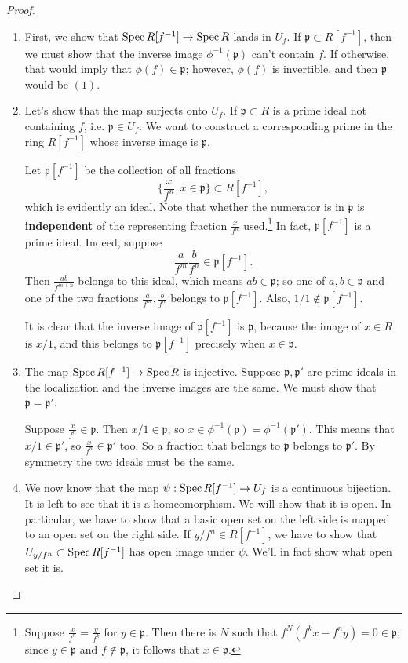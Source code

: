 \begin{proof} 
\begin{enumerate}
\item First, we show that $\operatorname{Spec} R[f^{-1}] \to \operatorname{Spec} R$ lands in
$U_f$. If
$\mathfrak{p} \subset R[f^{-1}]$, then we must show that the
inverse image
$\phi^{-1}(\mathfrak{p})$ can't contain $f$. If otherwise, that
would imply that
$\phi(f) \in \mathfrak{p}$; however, $\phi(f)$ is invertible,
and then
$\mathfrak{p}$ would be $(1)$.  
\item Let's show that the map surjects onto $U_f$. If
$\mathfrak{p} \subset R$ is a prime
ideal not containing $f$, i.e. $\mathfrak{p} \in U_f$. We want
to construct a
corresponding prime in the ring $R[f^{-1}]$ whose inverse image
is $\mathfrak{p}$.

Let $\mathfrak{p}[f^{-1}]$ be the collection of all fractions
\[ \{\frac{x}{f^n}, x \in \mathfrak{p}\} \subset R[f^{-1}],  \]
which is evidently an ideal. Note that whether the numerator is
in
$\mathfrak{p}$ is \textbf{independent} of the
representing fraction $\frac{x}{f^n}$ used.\footnote{Suppose
$\frac{x}{f^n} =
\frac{y}{f^k}$ for $y \in \mathfrak{p}$. Then there is $N$ such
that
$f^N(f^k x - f^n y) = 0 \in \mathfrak{p}$; since $y \in
\mathfrak{p}$ and $f
\notin \mathfrak{p}$, it follows that $x \in \mathfrak{p}$.}
In fact, $\mathfrak{p}[f^{-1}]$ is a prime ideal. Indeed,
suppose
\[  \frac{a}{f^m} \frac{b}{f^n} \in \mathfrak{p}[f^{-1}] .\]
Then $\frac{ab}{f^{m+n}}$ belongs to this ideal, which means $ab
\in
\mathfrak{p}$; so one of $a,b \in \mathfrak{p}$ and one of the
two fractions
$\frac{a}{f^m}, \frac{b}{f^n}$ belongs to
$\mathfrak{p}[f^{-1}]$. Also, $1/1
\notin \mathfrak{p}[f^{-1}]$.

It is clear that the inverse image of $\mathfrak{p}[f^{-1}]$ is
$\mathfrak{p}$,
because the image of $x \in R$ is $x/1$, and this belongs to
$\mathfrak{p}[f^{-1}]$ precisely when $x \in \mathfrak{p}$.
\item The map $\operatorname{Spec} R[f^{-1}] \to \operatorname{Spec} R$ is injective.
Suppose
$\mathfrak{p}, \mathfrak{p'}$ are prime ideals in the
localization and the
inverse images are the same.  
We must show that $\mathfrak{p} = \mathfrak{p'}$.

Suppose $\frac{x}{f^n} \in \mathfrak{p}$. Then $x/1 \in
\mathfrak{p}$, so $x
\in \phi^{-1}(\mathfrak{p}) = \phi^{-1}(\mathfrak{p}')$. This
means that $x/1
\in \mathfrak{p}'$, so 
$\frac{x}{f^n} \in \mathfrak{p}'$ too. So a fraction that
belongs to
$\mathfrak{p}$ belongs to $\mathfrak{p}'$. By symmetry the two
ideals must be
the same.  
\item We now know that the map $\psi: \operatorname{Spec} R[f^{-1}] \to U_f$
is a continuous
bijection. It is left to see that it is a homeomorphism. We will
show that it
is open.  
In particular, we have to show that a basic open set on the left
side is mapped
to an open set on the right side.
If $y/f^n \in R[f^{-1}]$, we have to show that $U_{y/f^n}
\subset \operatorname{Spec}
R[f^{-1}]$ has open image under $\psi$. We'll in fact show what
open set it is.


\end{enumerate}
\end{proof}
